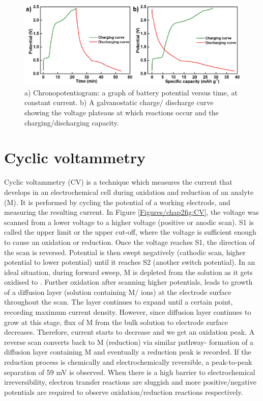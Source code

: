 \begin{figure}[th!]
\centering
\includegraphics[width=\textwidth]{Figures/chap2fig/ChrononCDC}
\caption{a) Chronopotentiogram: a graph of battery potential versus time, at constant current. b) A galvanostatic charge/ discharge curve showing the voltage plateaus at which reactions occur and the charging/discharging capacity.}
\label{Figures/chap2fig:ChrononCDC}
\end{figure}

\section{Cyclic voltammetry}
Cyclic voltammetry (CV) is a technique which measures the current that develops in an electrochemical cell during oxidation and reduction of an analyte (M). It is performed by cycling the potential of a working electrode, and measuring the resulting current. In Figure \ref{Figures/chap2fig:CV}, the voltage was scanned from a lower voltage to a higher voltage (positive or anodic scan). S1 is called the upper limit or the upper cut-off, where the voltage is sufficient enough to cause an oxidation or reduction. Once the voltage reaches S1, the direction of the scan is reversed. Potential is then swept negatively (cathodic scan, higher potential to lower potential) until it reaches S2 (another switch potential). In an ideal situation, during forward sweep, M is depleted from the solution as it gets oxidised to . Further oxidation after scanning higher potentials, leads to growth of a diffusion layer (solution containing M/ ions) at the electrode surface throughout the scan. The layer continues to expand until a certain point, recording maximum current density. However, since diffusion layer continues to grow at this stage, flux of M from the bulk solution to electrode surface decreases. Therefore, current starts to decrease and we get an oxidation peak. A reverse scan converts  back to M (reduction) via similar pathway- formation of a diffusion layer containing M and eventually a reduction peak is recorded. If the reduction process is chemically and electrochemically reversible, a peak-to-peak separation of 59 mV is observed. When there is a high barrier to electrochemical irreversibility, electron transfer reactions are sluggish and more positive/negative potentials are required to observe oxidation/reduction reactions respectively. 

